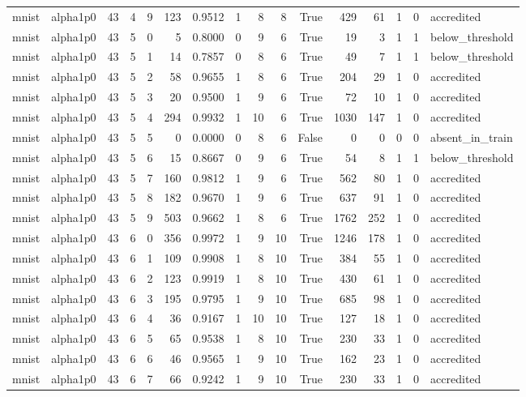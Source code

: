 \begin{tabular}{llrrrrrrrrrrrrrl}
mnist & alpha1p0 & 43 & 4 & 9 & 123 & 0.9512 & 1 & 8 & 8 & True & 429 & 61 & 1 & 0 & accredited \\
mnist & alpha1p0 & 43 & 5 & 0 & 5 & 0.8000 & 0 & 9 & 6 & True & 19 & 3 & 1 & 1 & below\_threshold \\
mnist & alpha1p0 & 43 & 5 & 1 & 14 & 0.7857 & 0 & 8 & 6 & True & 49 & 7 & 1 & 1 & below\_threshold \\
mnist & alpha1p0 & 43 & 5 & 2 & 58 & 0.9655 & 1 & 8 & 6 & True & 204 & 29 & 1 & 0 & accredited \\
mnist & alpha1p0 & 43 & 5 & 3 & 20 & 0.9500 & 1 & 9 & 6 & True & 72 & 10 & 1 & 0 & accredited \\
mnist & alpha1p0 & 43 & 5 & 4 & 294 & 0.9932 & 1 & 10 & 6 & True & 1030 & 147 & 1 & 0 & accredited \\
mnist & alpha1p0 & 43 & 5 & 5 & 0 & 0.0000 & 0 & 8 & 6 & False & 0 & 0 & 0 & 0 & absent\_in\_train \\
mnist & alpha1p0 & 43 & 5 & 6 & 15 & 0.8667 & 0 & 9 & 6 & True & 54 & 8 & 1 & 1 & below\_threshold \\
mnist & alpha1p0 & 43 & 5 & 7 & 160 & 0.9812 & 1 & 9 & 6 & True & 562 & 80 & 1 & 0 & accredited \\
mnist & alpha1p0 & 43 & 5 & 8 & 182 & 0.9670 & 1 & 9 & 6 & True & 637 & 91 & 1 & 0 & accredited \\
mnist & alpha1p0 & 43 & 5 & 9 & 503 & 0.9662 & 1 & 8 & 6 & True & 1762 & 252 & 1 & 0 & accredited \\
mnist & alpha1p0 & 43 & 6 & 0 & 356 & 0.9972 & 1 & 9 & 10 & True & 1246 & 178 & 1 & 0 & accredited \\
mnist & alpha1p0 & 43 & 6 & 1 & 109 & 0.9908 & 1 & 8 & 10 & True & 384 & 55 & 1 & 0 & accredited \\
mnist & alpha1p0 & 43 & 6 & 2 & 123 & 0.9919 & 1 & 8 & 10 & True & 430 & 61 & 1 & 0 & accredited \\
mnist & alpha1p0 & 43 & 6 & 3 & 195 & 0.9795 & 1 & 9 & 10 & True & 685 & 98 & 1 & 0 & accredited \\
mnist & alpha1p0 & 43 & 6 & 4 & 36 & 0.9167 & 1 & 10 & 10 & True & 127 & 18 & 1 & 0 & accredited \\
mnist & alpha1p0 & 43 & 6 & 5 & 65 & 0.9538 & 1 & 8 & 10 & True & 230 & 33 & 1 & 0 & accredited \\
mnist & alpha1p0 & 43 & 6 & 6 & 46 & 0.9565 & 1 & 9 & 10 & True & 162 & 23 & 1 & 0 & accredited \\
mnist & alpha1p0 & 43 & 6 & 7 & 66 & 0.9242 & 1 & 9 & 10 & True & 230 & 33 & 1 & 0 & accredited \\

\end{tabular}
